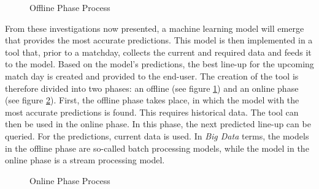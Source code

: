 \begin{figure}[H]
    \centering
    \captionsetup{justification=centering}
    \caption{Offline Phase Process}
    \label{fig:offline-phase}
\end{figure}

From these investigations now presented, a machine learning model will emerge that provides the most accurate predictions. This model is then implemented in a tool that, prior to a matchday, collects the current and required data and feeds it to the model. Based on the model's predictions, the best line-up for the upcoming match day is created and provided to the end-user. The creation of the tool is therefore divided into two phases: an offline (see figure \ref{fig:offline-phase}) and an online phase (see figure \ref{fig:online-phase}). First, the offline phase takes place, in which the model with the most accurate predictions is found. This requires historical data. The tool can then be used in the online phase. In this phase, the next predicted line-up can be queried. For the predictions, current data is used. In \emph{Big Data} terms, the models in the offline phase are so-called batch processing models, while the model in the online phase is a stream processing model.

\begin{figure}[H]
    \centering
    \captionsetup{justification=centering}
    \caption{Online Phase Process}
    \label{fig:online-phase}
\end{figure}


